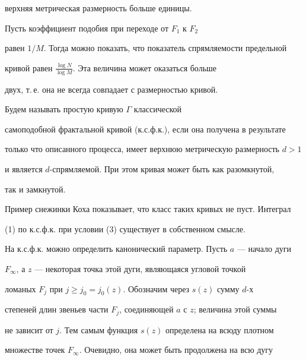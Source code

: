 верхняя метрическая размерность больше единицы.





\begin{note}


Пусть коэффициент подобия при переходе от $F_1$ к $F_2$


равен $1/M$. Тогда можно показать, что показатель спрямляемости предельной


кривой равен $\frac{\log N}{\log M}$. Эта величина может оказаться больше


двух, т.\,е. она не всегда совпадает с размерностью кривой.


\end{note}





\begin{defn}


Будем называть простую кривую $\Gamma$ классической


самоподобной фрактальной кривой (к.с.ф.к.), если она получена в результате


только что описанного процесса, имеет верхнюю метрическую размерность $d>1$


и является $d$-спрямляемой. При этом кривая может быть как разомкнутой,


так и замкнутой.


\end{defn}





Пример снежинки Коха показывает, что класс таких кривых не пуст. Интеграл


(1) по к.с.ф.к. при условии (3) существует в собственном смысле.





На к.с.ф.к. можно определить канонический параметр. Пусть $a$ --- начало дуги


$F_\infty$, а $z$ --- некоторая точка этой дуги, являющаяся угловой точкой


ломаных $F_j$ при $j\ge j_0 = j_0 (z)$. Обозначим через $s(z)$ сумму $d$-х


степеней длин звеньев части $F_j$, соединяющей $a$ с $z$; величина этой суммы


не зависит от $j$. Тем самым функция $s(z)$ определена на всюду плотном


множестве точек $F_\infty$. Очевидно, она может быть продолжена на всю дугу


